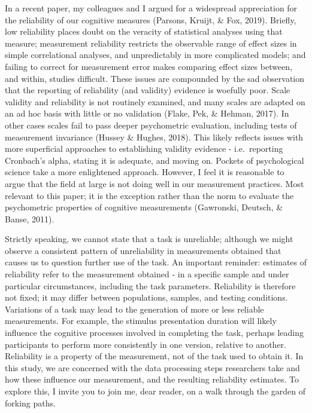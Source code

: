 \documentclass[
  man,floatsintext]{apa6}
\begin{document}
In a recent paper, my colleagues and I argued for a widespread appreciation for the reliability of our cognitive measures (Parsons, Kruijt, \& Fox, 2019). Briefly, low reliability places doubt on the veracity of statistical analyses using that measure; measurement reliability restricts the observable range of effect sizes in simple correlational analyses, and unpredictably in more complicated models; and failing to correct for measurement error makes comparing effect sizes between, and within, studies difficult. These issues are compounded by the sad observation that the reporting of reliability (and validity) evidence is woefully poor. Scale validity and reliability is not routinely examined, and many scales are adapted on an ad hoc basis with little or no validation (Flake, Pek, \& Hehman, 2017). In other cases scales fail to pass deeper psychometric evaluation, including tests of measurement invariance (Hussey \& Hughes, 2018). This likely reflects issues with more superficial approaches to establishing validity evidence - i.e.~reporting Cronbach's alpha, stating it is adequate, and moving on. Pockets of psychological science take a more enlightened approach. However, I feel it is reasonable to argue that the field at large is not doing well in our measurement practices. Most relevant to this paper; it is the exception rather than the norm to evaluate the psychometric properties of cognitive measurements (Gawronski, Deutsch, \& Banse, 2011).

Strictly speaking, we cannot state that a task is unreliable; although we might observe a consistent pattern of unreliability in measurements obtained that causes us to question further use of the task. An important reminder: estimates of reliability refer to the measurement obtained - in a specific sample and under particular circumstances, including the task parameters. Reliability is therefore not fixed; it may differ between populations, samples, and testing conditions. Variations of a task may lead to the generation of more or less reliable measurements. For example, the stimulus presentation duration will likely influence the cognitive processes involved in completing the task, perhaps leading participants to perform more consistently in one version, relative to another. Reliability is a property of the measurement, not of the task used to obtain it. In this study, we are concerned with the data processing steps researchers take and how these influence our measurement, and the resulting reliability estimates. To explore this, I invite you to join me, dear reader, on a walk through the garden of forking paths.
\end{document}
